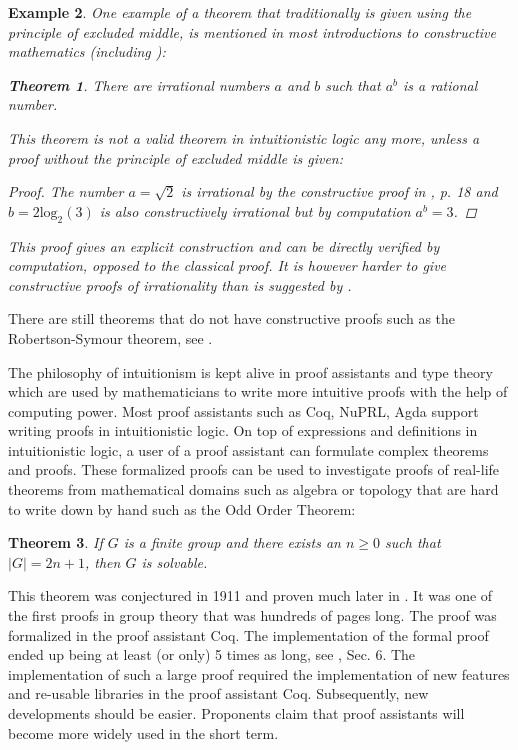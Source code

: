 \documentclass[12pt,a4paper,twoside,xetex]{book} %
\newtheorem{theorem}{Theorem}[section]
\newtheorem{example}[theorem]{Example}
\begin{document}
\begin{example}

One example of a theorem that traditionally is given using the principle of excluded middle, is mentioned in most introductions to constructive mathematics (including \cite{Palmgren2014}):

\begin{theorem}
  There are irrational numbers $a$ and $b$ such that $a^b$ is a rational number.
\end{theorem} 

This theorem is not a valid theorem in intuitionistic logic any more, unless a proof without the principle of excluded middle is given:

\begin{proof}
The number $a = \sqrt{2}$ is irrational by the constructive proof in \cite{Rosenblatt1983}, p. 18 and $b=2\text{log}_2(3)$ is also constructively irrational but by computation $a^b=3$.
\end{proof}

This proof gives an explicit construction and can be directly verified by computation, opposed to the classical proof. It is however harder to give constructive proofs of  irrationality than is suggested by \cite{Bauer2009}.

\end{example}

There are still theorems that do not have constructive proofs such as the Robertson-Symour theorem, see \cite{BIENSTOCK1995481}.

The philosophy of intuitionism is kept alive in proof assistants and type theory which are used by mathematicians to write more intuitive proofs with the help of computing power. Most proof assistants such as Coq, NuPRL, Agda support writing proofs in intuitionistic logic. On top of expressions and definitions in intuitionistic logic, a user of a proof assistant can formulate complex theorems and proofs. These formalized proofs can be used to investigate proofs of real-life theorems from mathematical domains such as algebra or topology that are hard to write down by hand such as the Odd Order Theorem:

\begin{theorem}
If $G$ is a finite group and there exists an $n \geq 0$ such that $|G| = 2n+1$, then $G$ is solvable.
\end{theorem}

This theorem was conjectured in 1911 and proven much later in \cite{Feit1963}. It was one of the first proofs in group theory that was hundreds of pages long. The proof was formalized in the proof assistant Coq. The implementation of the formal proof ended up being at least (or only) 5 times as long, see \cite{Gonthier2013}, Sec. 6. The implementation of such a large proof required the implementation of new features and re-usable libraries in the proof assistant Coq. Subsequently, new developments should be easier. Proponents claim that proof assistants will become more widely used in the short term.
\end{document}
